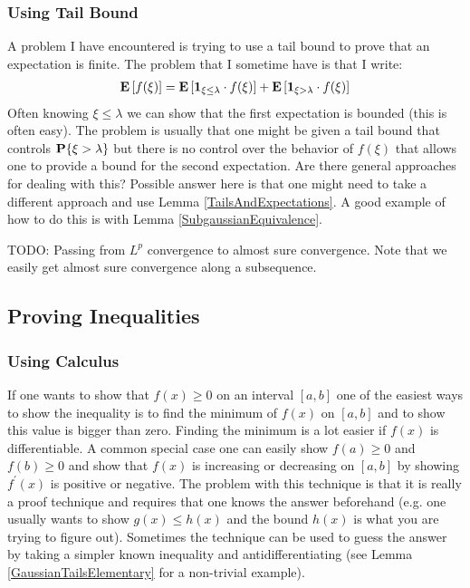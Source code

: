 \documentclass{amsart}
\theoremstyle{remark}
\theoremstyle{definition}
\begin{document}
\subsubsection{Using Tail Bound}
A problem I have encountered is trying to use a tail bound to prove
that an expectation is finite.  The problem that I sometime have is
that I write:
\begin{align*}
\textbf{E}\left[f(\xi)\right] = \textbf{E}\left[ \textbf{1}_{\xi \leq \lambda}
  \cdot f(\xi)\right] + \textbf{E}\left[\textbf{1}_{\xi > \lambda} \cdot f(\xi)\right]
\end{align*}
Often knowing $\xi \leq \lambda$ we can show that the first
expectation is bounded (this is often easy).  The problem is usually
that one might be given a tail bound that controls $\textbf{P}\{\xi >
  \lambda\}$ but there is no control over the behavior of $f(\xi)$ that
allows one to provide a bound for the second expectation.  Are there
general approaches for dealing with this?  Possible answer here is
that one might need to take a different approach and use Lemma
\ref{TailsAndExpectations}.  A good example of how to do this is with 
Lemma \ref{SubgaussianEquivalence}.

TODO: Passing from $L^p$ convergence to almost sure convergence.  Note
that we easily get almost sure convergence along a subsequence.

\subsection{Proving Inequalities}
\subsubsection{Using Calculus}
If one wants to show that $f(x) \geq 0$ on an interval $[a,b]$ one of
the easiest ways to show the inequality is to find the minimum of
$f(x)$ on $[a,b]$ and to show this value is bigger than zero.  Finding
the minimum is a lot easier if $f(x)$ is differentiable.  A common
special case one can easily show $f(a) \geq 0$ and $f(b) \geq
0$ and show that $f(x)$ is increasing or decreasing on $[a,b]$ by
showing $f^{\prime}(x)$ is positive or negative.  The problem with
this technique is that it is really a proof technique and requires
that one knows the answer beforehand (e.g. one usually wants to show
$g(x) \leq h(x)$ and the bound $h(x)$ is what you are trying to figure
out).  Sometimes the technique can be
used to guess the answer by taking a simpler known inequality and
antidifferentiating (see Lemma \ref{GaussianTailsElementary} for a non-trivial example).
\end{document}
